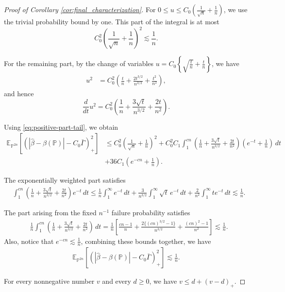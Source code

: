 \documentclass[11pt]{article}
\begin{document}
\begin{proof}[Proof of Corollary \ref{cor:final_characterization}]
For $0\le u\le
C_0\left(\frac1{\sqrt n}+\frac1n\right)$, we use the trivial probability bound by one. This part of the integral is at most
\[
C_0^2\left(\frac1{\sqrt n}+\frac1n\right)^2
\lesssim
\frac1n.
\]

For the remaining part, by the change of variables $u
=
C_0\left\{
\sqrt{\frac tn}+\frac tn
\right\}$, we have
\begin{align*}
u^2
&=
C_0^2
\left(
\frac tn+
\frac{2t^{3/2}}{n^{3/2}}+
\frac{t^2}{n^2}
\right),
\end{align*}
and hence
\[
\frac{d}{dt}u^2
=
C_0^2
\left(
\frac1n+
\frac{3\sqrt t}{n^{3/2}}+
\frac{2t}{n^2}
\right).
\]

Using \eqref{eq:positive-part-tail}, we obtain
\begin{align*}
\mathbb E_{\mathbb P^{2n}}
\left[
\left(
\left|
\widehat\beta-\beta(\mathbb P)
\right|
-C_0\bar\Gamma
\right)_+^2
\right]
&\le
C_0^2\left(\frac1{\sqrt n}+\frac1n\right)^2+
C_0^2C_1
\int_1^{cn}
\left(
\frac1n+
\frac{3\sqrt t}{n^{3/2}}+
\frac{2t}{n^2}
\right)
\left(e^{-t}+\frac1n\right)\,dt
\\
&+
36C_1\left(e^{-cn}+\frac1n\right).
\end{align*}

The exponentially weighted part satisfies
\begin{align*}
&\int_1^{cn}
\left(
\frac1n+
\frac{3\sqrt t}{n^{3/2}}+
\frac{2t}{n^2}
\right)e^{-t}\,dt
\le
\frac1n\int_1^\infty e^{-t}\,dt
+
\frac3{n^{3/2}}\int_1^\infty\sqrt t\,e^{-t}\,dt
+
\frac2{n^2}\int_1^\infty t e^{-t}\,dt
\lesssim
\frac1n.
\end{align*}

The part arising from the fixed \(n^{-1}\) failure probability satisfies
\begin{align*}
&\frac1n
\int_1^{cn}
\left(
\frac1n+
\frac{3\sqrt t}{n^{3/2}}+
\frac{2t}{n^2}
\right)\,dt
=
\frac1n
\left[
\frac{cn-1}{n}
+
\frac{2\{(cn)^{3/2}-1\}}{n^{3/2}}
+
\frac{(cn)^2-1}{n^2}
\right]
\lesssim
\frac1n.
\end{align*}
Also, notice that $e^{-cn}\lesssim\frac1n$,
combining these bounds together, we have
\begin{align}
\mathbb E_{\mathbb P^{2n}}
\left[
\left(
\left|
\widehat\beta-\beta(\mathbb P)
\right|
-C_0\bar\Gamma
\right)_+^2
\right]
\lesssim
\frac1n.
\label{eq:positive-part-second-moment}
\end{align}

For every nonnegative number \(v\) and every \(d\ge0\), we have $v
\le
d+(v-d)_+$.


\end{proof}
\end{document}
